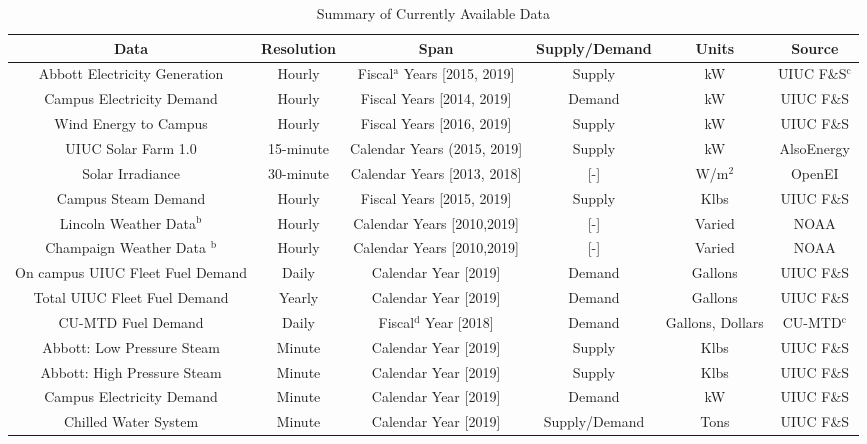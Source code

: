\begin{landscape}

  \begin{table}
    \centering
    \caption{Summary of Currently Available Data}
    \label{tab:datasummary}
    \begin{tabular}{c|c|c|c|c|c}
      \hline
      Data & Resolution & Span & Supply/Demand & Units & Source\\
      \hline
      Abbott Electricity Generation & Hourly & Fiscal$^{\text{a}}$ Years [2015, 2019]& Supply & kW & UIUC F\&S$^{\text{c}}$\\
      Campus Electricity Demand & Hourly & Fiscal Years [2014, 2019] & Demand & kW & UIUC F\&S \\
      Wind Energy to Campus & Hourly & Fiscal Years [2016, 2019] & Supply & kW & UIUC F\&S \\
      UIUC Solar Farm 1.0 & 15-minute & Calendar Years (2015, 2019] & Supply & kW & AlsoEnergy \cite{alsoenergy_university_2019}\\
      Solar Irradiance & 30-minute & Calendar Years [2013, 2018]& [-] & W/m$^2$& OpenEI \cite{sengupta_national_2018}\\
      Campus Steam Demand & Hourly & Fiscal Years [2015, 2019] & Supply & Klbs & UIUC F\&S\\
      Lincoln Weather Data$^{\text{b}}$ & Hourly & Calendar Years [2010,2019] & [-] & Varied & NOAA \cite{noauthor_climate_nodate} \\
      Champaign Weather Data $^{\text{b}}$& Hourly & Calendar Years [2010,2019]& [-] & Varied & NOAA \cite{noauthor_climate_nodate}\\
      On campus UIUC Fleet Fuel Demand & Daily & Calendar Year [2019]& Demand & Gallons & UIUC F\&S \\
      Total UIUC Fleet Fuel Demand & Yearly & Calendar Year [2019]& Demand & Gallons & UIUC F\&S \\
      CU-MTD Fuel Demand & Daily & Fiscal$^{\text{d}}$ Year [2018]& Demand & Gallons, Dollars & CU-MTD$^{\text{c}}$ \\
      Abbott: Low Pressure Steam & Minute & Calendar Year [2019] & Supply & Klbs & UIUC F\&S\\
      Abbott: High Pressure Steam & Minute & Calendar Year [2019] & Supply & Klbs & UIUC F\&S\\
      Campus Electricity Demand & Minute & Calendar Year [2019] & Demand & kW & UIUC F\&S\\
      Chilled Water System & Minute & Calendar Year [2019] & Supply/Demand & Tons & UIUC F\&S\\

\end{tabular}
\end{table}
\end{landscape}
